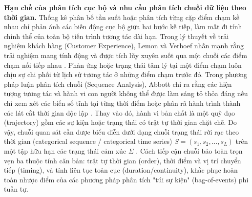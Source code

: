 \documentclass[../LuanVan.tex]{subfiles}
\begin{document}
\noindent\textbf{Hạn chế của phân tích cục bộ và nhu cầu phân tích chuỗi dữ liệu theo thời gian.} Thống kê phân bố tần suất hoặc phân tích từng cặp điểm chạm kề nhau chỉ phản ánh các biến động cục bộ giữa hai bước kế tiếp, làm mất đi tính chỉnh thể của toàn bộ tiến trình tương tác dài hạn. Trong lý thuyết về trải nghiệm khách hàng (Customer Experience), Lemon và Verhoef nhấn mạnh rằng trải nghiệm mang tính động và được tích lũy xuyên suốt qua một chuỗi các điểm chạm nối tiếp nhau \cite{lemon2016customerjourney}. Phản ứng hoặc trạng thái tâm lý tại một điểm chạm luôn chịu sự chi phối từ lịch sử tương tác ở những điểm chạm trước đó. Trong phương pháp luận phân tích chuỗi (Sequence Analysis), Abbott chỉ ra rằng các hiện tượng tương tác và hành vi con người không thể được làm sáng tỏ thỏa đáng nếu chỉ xem xét các biến số tĩnh tại từng thời điểm hoặc phân rã hành trình thành các lát cắt thời gian độc lập \cite{abbott2000sequence}. Thay vào đó, hành vi bản chất là một quỹ đạo (trajectory) gồm các sự kiện hoặc trạng thái có trật tự thời gian chặt chẽ. Do vậy, chuỗi quan sát cần được biểu diễn dưới dạng chuỗi trạng thái rời rạc theo thời gian (categorical sequence / categorical time series) $S = (s_1, s_2, \dots, s_L)$ trên một tập hữu hạn các trạng thái cảm xúc $\Sigma$ \cite{gabadinho2011traminer,studer2016sequence}. Cách tiếp cận chuỗi bảo toàn trọn vẹn ba thuộc tính căn bản: trật tự thời gian (order), thời điểm và vị trí chuyển tiếp (timing), và tính liên tục toàn cục (duration/continuity), khắc phục hoàn toàn nhược điểm của các phương pháp phân tích "túi sự kiện" (bag-of-events) phi tuần tự.
\end{document}
